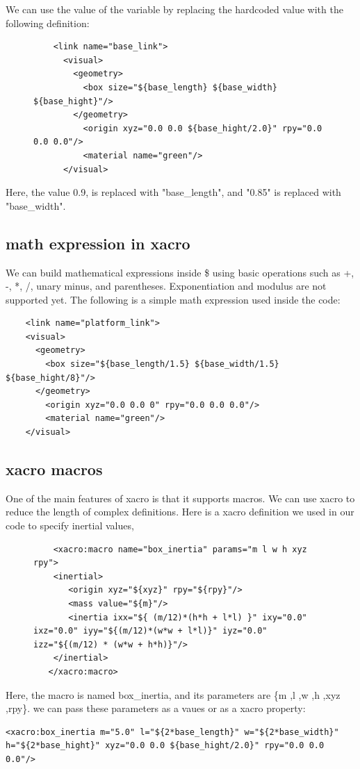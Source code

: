 \documentclass[../../main]{subfiles}
\begin{document}
We can use the value of the variable by replacing the hardcoded value with the following
definition:
\begin{figure}[h!]
  \begin{verbatim}
    <link name="base_link">
      <visual>
        <geometry>
          <box size="${base_length} ${base_width} ${base_hight}"/>
        </geometry>
          <origin xyz="0.0 0.0 ${base_hight/2.0}" rpy="0.0 0.0 0.0"/>
          <material name="green"/>
      </visual>
\end{verbatim}
  \end{figure}
\newpage
Here, the  value 0.9, is replaced with "{base\_length}", and "0.85" is
replaced with "{base\_width}".

\subsection{math expression in xacro}
We can build mathematical expressions inside \${} using basic operations such as +, -, *,
/, unary minus, and parentheses. Exponentiation and modulus are not supported yet. The
following is a simple math expression used inside the code:

\begin{verbatim}
    <link name="platform_link">
    <visual>
      <geometry>
        <box size="${base_length/1.5} ${base_width/1.5} ${base_hight/8}"/>
      </geometry>
        <origin xyz="0.0 0.0 0" rpy="0.0 0.0 0.0"/>
        <material name="green"/>
    </visual>
\end{verbatim}

\subsection{xacro macros}
One of the main features of xacro is that it supports macros. We can use xacro to reduce
the length of complex definitions. Here is a xacro definition we used in our code to
specify inertial values,
\begin{figure}[h!]
  \begin{verbatim}
    <xacro:macro name="box_inertia" params="m l w h xyz rpy">
    <inertial>
       <origin xyz="${xyz}" rpy="${rpy}"/>
       <mass value="${m}"/>
       <inertia ixx="${ (m/12)*(h*h + l*l) }" ixy="0.0" ixz="0.0" iyy="${(m/12)*(w*w + l*l)}" iyz="0.0" izz="${(m/12) * (w*w + h*h)}"/>
    </inertial>
   </xacro:macro>
\end{verbatim}
\end{figure}
Here, the macro is named box\_inertia, and its parameters are \{m ,l ,w ,h ,xyz ,rpy\}. we can pass these parameters as a vaues or as a xacro property:
\begin{verbatim}
<xacro:box_inertia m="5.0" l="${2*base_length}" w="${2*base_width}" h="${2*base_hight}" xyz="0.0 0.0 ${base_hight/2.0}" rpy="0.0 0.0 0.0"/>
\end{verbatim}
\end{document}
